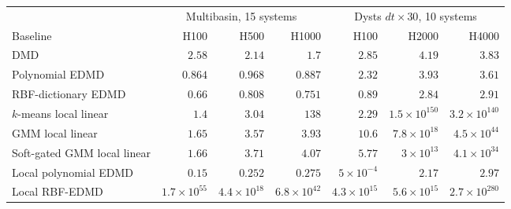 \begin{tabular}{@{}l rrr rrr@{}}
\toprule
& \multicolumn{3}{c}{Multibasin, 15 systems} & \multicolumn{3}{c}{Dysts \(dt{\times}30\), 10 systems} \\
\cmidrule(lr){2-4}\cmidrule(l){5-7}
Baseline & H100 & H500 & H1000 & H100 & H2000 & H4000 \\
\midrule
DMD & $2.58$ & $2.14$ & $1.7$ & $2.85$ & $4.19$ & $3.83$ \\
Polynomial EDMD & $0.864$ & $0.968$ & $0.887$ & $2.32$ & $3.93$ & $3.61$ \\
RBF-dictionary EDMD & $0.66$ & $0.808$ & $0.751$ & $0.89$ & $2.84$ & $2.91$ \\
$k$-means local linear & $1.4$ & $3.04$ & $138$ & $2.29$ & $1.5{\times}10^{150}$ & $3.2{\times}10^{140}$ \\
GMM local linear & $1.65$ & $3.57$ & $3.93$ & $10.6$ & $7.8{\times}10^{18}$ & $4.5{\times}10^{44}$ \\
Soft-gated GMM local linear & $1.66$ & $3.71$ & $4.07$ & $5.77$ & $3{\times}10^{13}$ & $4.1{\times}10^{34}$ \\
Local polynomial EDMD & $0.15$ & $0.252$ & $0.275$ & $5{\times}10^{-4}$ & $2.17$ & $2.97$ \\
Local RBF-EDMD & $1.7{\times}10^{55}$ & $4.4{\times}10^{18}$ & $6.8{\times}10^{42}$ & $4.3{\times}10^{15}$ & $5.6{\times}10^{15}$ & $2.7{\times}10^{280}$ \\
\bottomrule
\end{tabular}
